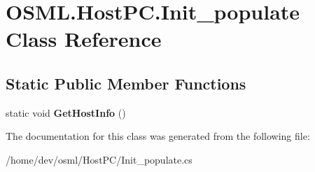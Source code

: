 \hypertarget{classOSML_1_1HostPC_1_1Init__populate}{}\section{O\+S\+M\+L.\+Host\+P\+C.\+Init\+\_\+populate Class Reference}
\label{classOSML_1_1HostPC_1_1Init__populate}
\subsection*{Static Public Member Functions}
\begin{DoxyCompactItemize}
\item 
\mbox{\label{classOSML_1_1HostPC_1_1Init__populate_a74c91e2709643f98fce42f992a1de4dc}} 
static void {\bfseries Get\+Host\+Info} ()
\end{DoxyCompactItemize}


The documentation for this class was generated from the following file\+:\begin{DoxyCompactItemize}
\item 
/home/dev/osml/\+Host\+P\+C/Init\+\_\+populate.\+cs\end{DoxyCompactItemize}
